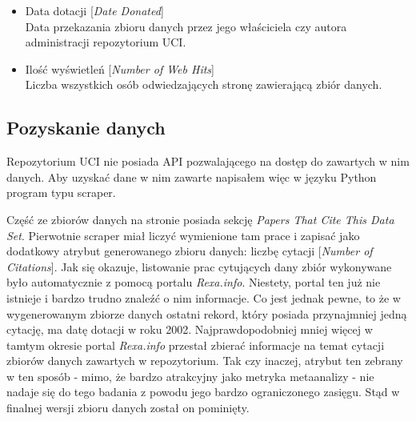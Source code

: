 \begin{itemize}
  \item Data dotacji [\emph{Date Donated}] \\
        Data przekazania zbioru danych przez jego właściciela czy autora administracji repozytorium UCI.

  \item Ilość wyświetleń [\emph{Number of Web Hits}] \\
        Liczba wszystkich osób odwiedzających stronę zawierającą zbiór danych.

\end{itemize}

\subsection{Pozyskanie danych}

Repozytorium UCI nie posiada API pozwalającego na dostęp do zawartych w nim danych.
Aby uzyskać dane w nim zawarte napisałem więc w języku Python program typu scraper.

Część ze zbiorów danych na stronie posiada sekcję \emph{Papers That Cite This Data Set}.
Pierwotnie scraper miał liczyć wymienione tam prace i zapisać jako dodatkowy atrybut generowanego zbioru danych: liczbę cytacji [\emph{Number of Citations}].
Jak się okazuje, listowanie prac cytujących dany zbiór wykonywane było automatycznie z pomocą portalu \emph{Rexa.info}.
Niestety, portal ten już nie istnieje i bardzo trudno znaleźć o nim informacje.
Co jest jednak pewne, to że w wygenerowanym zbiorze danych ostatni rekord, który posiada przynajmniej jedną cytację, ma datę dotacji w roku 2002.
Najprawdopodobniej mniej więcej w tamtym okresie portal \emph{Rexa.info} przestał zbierać informacje na temat cytacji zbiorów danych zawartych w repozytorium.
Tak czy inaczej, atrybut ten zebrany w ten sposób - mimo, że bardzo atrakcyjny jako metryka metaanalizy - nie nadaje się do tego badania z powodu jego bardzo ograniczonego zasięgu.
Stąd w finalnej wersji zbioru danych został on pominięty.

